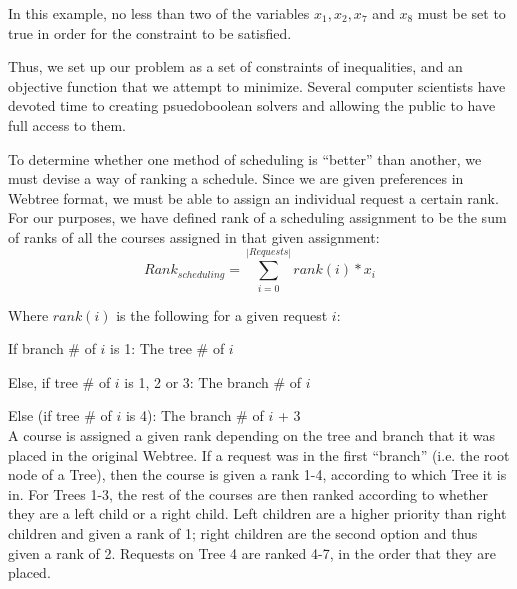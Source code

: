 In this example, no less than two of the variables $x_1, x_2, x_7$ and $x_8$
must be set to true in order for the constraint to be satisfied.

Thus, we set up our problem as a set of
constraints of inequalities, and an objective function that we attempt
to minimize. Several computer scientists have devoted time to creating
psuedoboolean solvers and allowing the public to have full access to
them.

To determine whether one method of scheduling is ``better'' than
another, we must devise a way of ranking a schedule. Since we are
given preferences in Webtree format, we must be able to assign an
individual request a certain rank. For our purposes, we have defined
rank of a scheduling assignment to be the sum of ranks of all the
courses assigned in that given assignment: \begin{equation}\label{rank}Rank_{scheduling} =
  \sum_{i=0}^{|Requests|}{rank(i)*x_i}\end{equation} 

Where $rank(i)$ is the following for a given request $i$:

If branch $\#$ of $i$ is 1: The tree $\#$ of $i$

Else, if tree $\#$ of $i$ is 1, 2 or 3: The branch $\#$ of $i$

Else (if tree $\#$ of $i$ is 4): The branch $\#$ of $i$ + 3\\

A course is assigned a given rank depending on the tree and branch
that it was placed in the original Webtree. If a request was in the
first ``branch'' (i.e. the root node of a Tree), then the course is given
a rank {1-4}, according to which Tree it is in. For Trees {1-3}, the
rest of the courses are then ranked according to whether they are a
left child or a right child. Left children are a higher priority than right
children and given a rank of 1; right children are the second option
and thus given a rank of 2. Requests on Tree 4 are ranked {4-7}, in
the order that they are placed.



